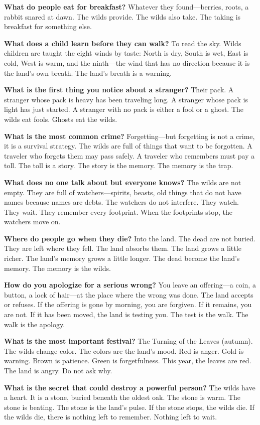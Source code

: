\vspace{1em}

\begin{almanac}
\textbf{What do people eat for breakfast?} Whatever they found---berries, roots, a rabbit snared at dawn. The wilds provide. The wilds also take. The taking is breakfast for something else.

\textbf{What does a child learn before they can walk?} To read the sky. Wilds children are taught the eight winds by taste: North is dry, South is wet, East is cold, West is warm, and the ninth---the wind that has no direction because it is the land's own breath. The land's breath is a warning.

\textbf{What is the first thing you notice about a stranger?} Their pack. A stranger whose pack is heavy has been traveling long. A stranger whose pack is light has just started. A stranger with no pack is either a fool or a ghost. The wilds eat fools. Ghosts eat the wilds.

\textbf{What is the most common crime?} Forgetting---but forgetting is not a crime, it is a survival strategy. The wilds are full of things that want to be forgotten. A traveler who forgets them may pass safely. A traveler who remembers must pay a toll. The toll is a story. The story is the memory. The memory is the trap.

\textbf{What does no one talk about but everyone knows?} The wilds are not empty. They are full of watchers---spirits, beasts, old things that do not have names because names are debts. The watchers do not interfere. They watch. They wait. They remember every footprint. When the footprints stop, the watchers move on.

\textbf{Where do people go when they die?} Into the land. The dead are not buried. They are left where they fell. The land absorbs them. The land grows a little richer. The land's memory grows a little longer. The dead become the land's memory. The memory is the wilds.

\textbf{How do you apologize for a serious wrong?} You leave an offering---a coin, a button, a lock of hair---at the place where the wrong was done. The land accepts or refuses. If the offering is gone by morning, you are forgiven. If it remains, you are not. If it has been moved, the land is testing you. The test is the walk. The walk is the apology.

\textbf{What is the most important festival?} The Turning of the Leaves (autumn). The wilds change color. The colors are the land's mood. Red is anger. Gold is warning. Brown is patience. Green is forgetfulness. This year, the leaves are red. The land is angry. Do not ask why.

\textbf{What is the secret that could destroy a powerful person?} The wilds have a heart. It is a stone, buried beneath the oldest oak. The stone is warm. The stone is beating. The stone is the land's pulse. If the stone stops, the wilds die. If the wilds die, there is nothing left to remember. Nothing left to wait.
\end{almanac}

